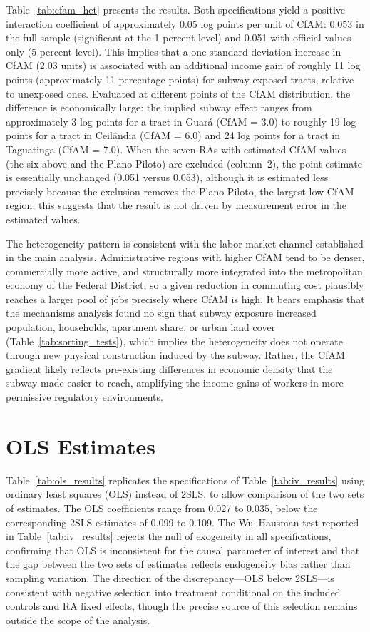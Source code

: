 Table~\ref{tab:cfam_het} presents the results. Both specifications yield a positive interaction coefficient of approximately 0.05 log points per unit of CfAM: 0.053 in the full sample (significant at the 1 percent level) and 0.051 with official values only (5 percent level). This implies that a one-standard-deviation increase in CfAM (2.03 units) is associated with an additional income gain of roughly 11 log points (approximately 11 percentage points) for subway-exposed tracts, relative to unexposed ones. Evaluated at different points of the CfAM distribution, the difference is economically large: the implied subway effect ranges from approximately 3 log points for a tract in Guará (CfAM = 3.0) to roughly 19 log points for a tract in Ceilândia (CfAM = 6.0) and 24 log points for a tract in Taguatinga (CfAM = 7.0). When the seven RAs with estimated CfAM values (the six above and the Plano Piloto) are excluded (column~2), the point estimate is essentially unchanged (0.051 versus 0.053), although it is estimated less precisely because the exclusion removes the Plano Piloto, the largest low-CfAM region; this suggests that the result is not driven by measurement error in the estimated values.

The heterogeneity pattern is consistent with the labor-market channel established in the main analysis. Administrative regions with higher CfAM tend to be denser, commercially more active, and structurally more integrated into the metropolitan economy of the Federal District, so a given reduction in commuting cost plausibly reaches a larger pool of jobs precisely where CfAM is high. It bears emphasis that the mechanisms analysis found no sign that subway exposure increased population, households, apartment share, or urban land cover (Table~\ref{tab:sorting_tests}), which implies the heterogeneity does not operate through new physical construction induced by the subway. Rather, the CfAM gradient likely reflects pre-existing differences in economic density that the subway made easier to reach, amplifying the income gains of workers in more permissive regulatory environments.

\section{OLS Estimates}
\label{s:appendix_ols}

Table~\ref{tab:ols_results} replicates the specifications of Table~\ref{tab:iv_results} using ordinary least squares (OLS) instead of 2SLS, to allow comparison of the two sets of estimates. The OLS coefficients range from 0.027 to 0.035, below the corresponding 2SLS estimates of 0.099 to 0.109. The Wu--Hausman test reported in Table~\ref{tab:iv_results} rejects the null of exogeneity in all specifications, confirming that OLS is inconsistent for the causal parameter of interest and that the gap between the two sets of estimates reflects endogeneity bias rather than sampling variation. The direction of the discrepancy---OLS below 2SLS---is consistent with negative selection into treatment conditional on the included controls and RA fixed effects, though the precise source of this selection remains outside the scope of the analysis.

